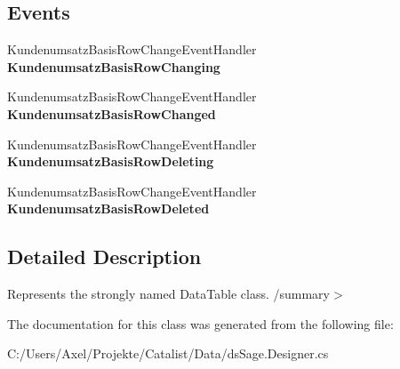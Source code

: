 \subsection*{Events}
\begin{DoxyCompactItemize}
\item 
Kundenumsatz\+Basis\+Row\+Change\+Event\+Handler {\bfseries Kundenumsatz\+Basis\+Row\+Changing}\hypertarget{class_products_1_1_data_1_1ds_sage_1_1_kundenumsatz_basis_data_table_a3b6ecc51c59b8b4dcdc8560241de6953}{}\label{class_products_1_1_data_1_1ds_sage_1_1_kundenumsatz_basis_data_table_a3b6ecc51c59b8b4dcdc8560241de6953}

\item 
Kundenumsatz\+Basis\+Row\+Change\+Event\+Handler {\bfseries Kundenumsatz\+Basis\+Row\+Changed}\hypertarget{class_products_1_1_data_1_1ds_sage_1_1_kundenumsatz_basis_data_table_ac743ad78c597802db3e101f836db0fa5}{}\label{class_products_1_1_data_1_1ds_sage_1_1_kundenumsatz_basis_data_table_ac743ad78c597802db3e101f836db0fa5}

\item 
Kundenumsatz\+Basis\+Row\+Change\+Event\+Handler {\bfseries Kundenumsatz\+Basis\+Row\+Deleting}\hypertarget{class_products_1_1_data_1_1ds_sage_1_1_kundenumsatz_basis_data_table_a98b07fbc3533af555052e4ee106edb95}{}\label{class_products_1_1_data_1_1ds_sage_1_1_kundenumsatz_basis_data_table_a98b07fbc3533af555052e4ee106edb95}

\item 
Kundenumsatz\+Basis\+Row\+Change\+Event\+Handler {\bfseries Kundenumsatz\+Basis\+Row\+Deleted}\hypertarget{class_products_1_1_data_1_1ds_sage_1_1_kundenumsatz_basis_data_table_a2ae6a2c6da03194af79fcfe599d3366f}{}\label{class_products_1_1_data_1_1ds_sage_1_1_kundenumsatz_basis_data_table_a2ae6a2c6da03194af79fcfe599d3366f}

\end{DoxyCompactItemize}


\subsection{Detailed Description}
Represents the strongly named Data\+Table class. /summary$>$ 

The documentation for this class was generated from the following file\+:\begin{DoxyCompactItemize}
\item 
C\+:/\+Users/\+Axel/\+Projekte/\+Catalist/\+Data/ds\+Sage.\+Designer.\+cs\end{DoxyCompactItemize}
